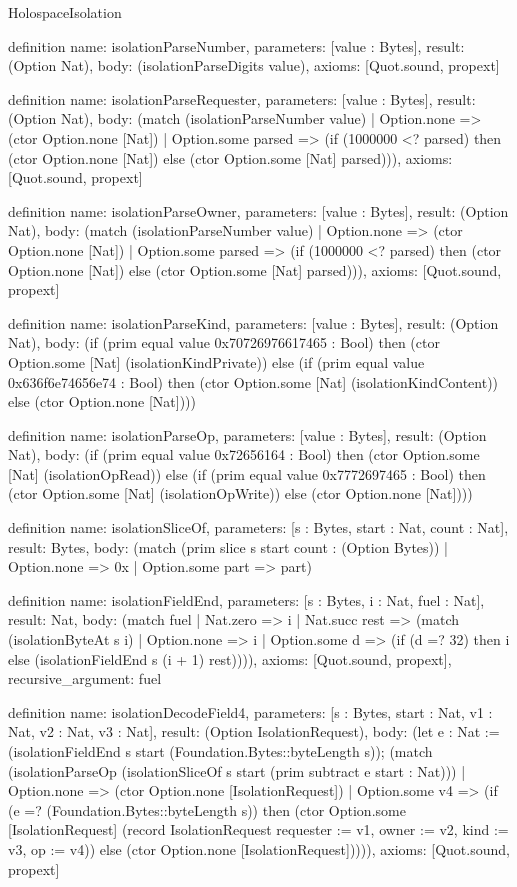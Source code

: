 \begin{lexlean}{HolospaceIsolation}
\begin{semanticmodule}
definition{
  name: isolationParseNumber,
  parameters: [value : Bytes],
  result: (Option Nat),
  body: (isolationParseDigits value),
  axioms: [Quot.sound, propext]
}

definition{
  name: isolationParseRequester,
  parameters: [value : Bytes],
  result: (Option Nat),
  body: (match (isolationParseNumber value)
    | Option.none => (ctor Option.none [Nat])
    | Option.some parsed => (if (1000000 <? parsed) then (ctor Option.none [Nat]) else (ctor Option.some [Nat] parsed))),
  axioms: [Quot.sound, propext]
}

definition{
  name: isolationParseOwner,
  parameters: [value : Bytes],
  result: (Option Nat),
  body: (match (isolationParseNumber value)
    | Option.none => (ctor Option.none [Nat])
    | Option.some parsed => (if (1000000 <? parsed) then (ctor Option.none [Nat]) else (ctor Option.some [Nat] parsed))),
  axioms: [Quot.sound, propext]
}

definition{
  name: isolationParseKind,
  parameters: [value : Bytes],
  result: (Option Nat),
  body: (if (prim equal value 0x70726976617465 : Bool) then (ctor Option.some [Nat] (isolationKindPrivate)) else (if (prim equal value 0x636f6e74656e74 : Bool) then (ctor Option.some [Nat] (isolationKindContent)) else (ctor Option.none [Nat])))
}

definition{
  name: isolationParseOp,
  parameters: [value : Bytes],
  result: (Option Nat),
  body: (if (prim equal value 0x72656164 : Bool) then (ctor Option.some [Nat] (isolationOpRead)) else (if (prim equal value 0x7772697465 : Bool) then (ctor Option.some [Nat] (isolationOpWrite)) else (ctor Option.none [Nat])))
}

definition{
  name: isolationSliceOf,
  parameters: [s : Bytes, start : Nat, count : Nat],
  result: Bytes,
  body: (match (prim slice s start count : (Option Bytes))
    | Option.none => 0x
    | Option.some part => part)
}

definition{
  name: isolationFieldEnd,
  parameters: [s : Bytes, i : Nat, fuel : Nat],
  result: Nat,
  body: (match fuel
    | Nat.zero => i
    | Nat.succ rest => (match (isolationByteAt s i)
      | Option.none => i
      | Option.some d => (if (d =? 32) then i else (isolationFieldEnd s (i + 1) rest)))),
  axioms: [Quot.sound, propext],
  recursive_argument: fuel
}

definition{
  name: isolationDecodeField4,
  parameters: [s : Bytes, start : Nat, v1 : Nat, v2 : Nat, v3 : Nat],
  result: (Option IsolationRequest),
  body: (let e : Nat := (isolationFieldEnd s start (Foundation.Bytes::byteLength s)); (match (isolationParseOp (isolationSliceOf s start (prim subtract e start : Nat)))
    | Option.none => (ctor Option.none [IsolationRequest])
    | Option.some v4 => (if (e =? (Foundation.Bytes::byteLength s)) then (ctor Option.some [IsolationRequest] (record IsolationRequest {requester := v1, owner := v2, kind := v3, op := v4})) else (ctor Option.none [IsolationRequest])))),
  axioms: [Quot.sound, propext]
}


\end{semanticmodule}
\end{lexlean}
